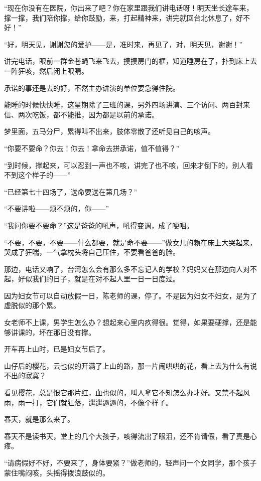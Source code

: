 \par “现在你没有在医院，你出来了吧？你在家里跟我们讲电话呀！明天坐长途车来，撑一撑，我们陪你撑，给你鼓励，来，打起精神来，讲完就回台北休息了，好不好！”
\par “好，明天见，谢谢您的爱护——是，准时来，再见了，对，明天见，谢谢！”
\par 讲完电话，眼前一群金苍蝇飞来飞去，摸摸房门的框，知道睡房在了，扑到床上去一阵狂咳，然后闭上眼睛。
\par 承诺的事还是去的好，不然主办讲演的单位要急得住院。
\par 能睡的时候快快睡，这星期除了三班的课，另外四场讲演、三个访问、两百封来信、两次吃饭，都不能推，因为都是以前的承诺。
\par 梦里面，五马分尸，累得叫不出来，肢体零散了还听见自己的咳声。
\par “你要不要命？你去！你去！拿命去拼承诺，值不值得？”
\par “到时候，撑起来，可以忍到一声也不咳，讲完了也不咳，回来才倒下的，别人看不到这个样子的——”
\par “已经第七十四场了，送命要送在第几场？”
\par “不要讲啦——烦不烦的，你——”
\par “我问你要不要命？”这是爸爸的吼声，吼得变调，成了哽咽。
\par “不要，不要，不要——什么都要，就是命不要——”做女儿的赖在床上大哭起来，哭成了狂喘，一气拿枕头将自己压住，不要看爸爸的脸。
\par 那边，电话又响了，台湾怎么会有那么多不忘记人的学校？妈妈又在那边向人对不起，好似我们的日子，就是在对不起人里一日一日度过。
\par 因为妇女节可以自动放假一日，陈老师的课，停了。不是因为妇女不妇女，是为了虚脱似的那个累。
\par 女老师不上课，男学生怎么办？想起来心里内疚得很。觉得，如果要硬撑，还是能够讲课的，坏在那日没有撑。
\par 开车再上山时，已是妇女节后了。
\par 山仔后的樱花，云也似的开满了上山的路，那一片闹哄哄的花，看上去为什么有说不出的寂寞？
\par 看见樱花，总是恨它那片红，血也似的，叫人拿它不知怎么办才好。又禁不起风雨，雨一打，它们就狂落，邋邋遢遢的，不像个样子。
\par 春天，就是那么来了。
\par 春天不是读书天，堂上的几个大孩子，咳得流出了眼泪，还不肯请假，看了真是心疼。
\par “请病假好不好，不要来了，身体要紧？”做老师的，轻声问一个女同学，那个孩子蒙住嘴闷咳，头摇得拨浪鼓似的。
